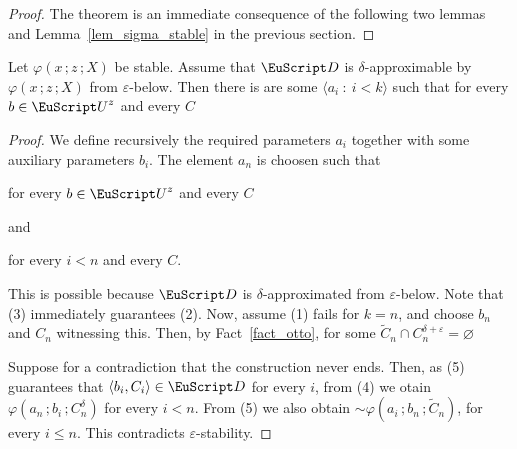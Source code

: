 \begin{proof}
  The theorem is an immediate consequence of the following two lemmas and Lemma~\ref{lem_sigma_stable} in the previous section.
\end{proof}

\begin{lemma}
  Let $\varphi(x\,;z\,;X)$ be stable.
  Assume that ${\EuScript D}$ is $\delta$-approximable by $\varphi(x\,;z\,;X)$ from $\varepsilon$-below.
  Then there is are some $\langle a_i\ :\ i<k\rangle$ such that for every $b\in{\EuScript U}^z$ and every $C$\medskip

  \medskip 

\end{lemma}

\begin{proof}
  We define recursively the required parameters $a_i$ together with some auxiliary parameters $b_i$.
  The element $a_n$ is choosen such that

  \hfill for every $b\in{\EuScript U}^z$ and every $C$

  and

  \hfill for every $i<n$ and every $C$.\smallskip

  This is possible because ${\EuScript D}$ is $\delta$-approximated from $\varepsilon$-below.
  Note that (3) immediately guarantees (2).
  Now, assume (1) fails for $k=n$, and choose $b_n$ and $C_n$ witnessing this.
  Then, by Fact~\ref{fact_otto}, for some $\tilde C_n\cap C_n^{\delta+\varepsilon}=\varnothing$


  Suppose for a contradiction that the construction never ends.
  Then, as (5) guarantees that $\langle b_i,C_i\rangle\in{\EuScript D}$ for every $i$, from (4) we otain $\varphi(a_n\,;b_i\,;C_n^\delta)$ for every $i<n$.
  From (5) we also obtain ${\sim}\varphi(a_i\,;b_n\,;\tilde C_n)$, for every $i\le n$.
  This contradicts $\varepsilon$-stability.
\end{proof}

